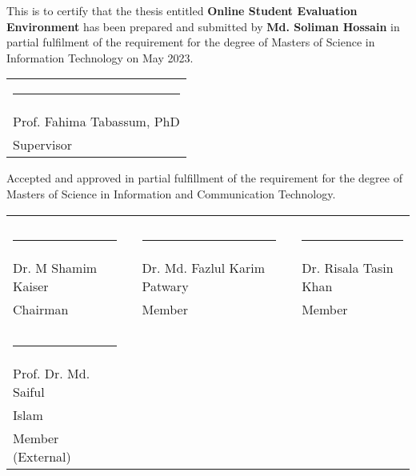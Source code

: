 This is to certify that the thesis entitled \textbf{Online Student Evaluation Environment} has been prepared and submitted by \textbf{Md. Soliman Hossain} in partial fulfilment of the requirement for the degree of
Masters of Science in Information Technology on May 2023.
\bigskip
\bigskip
\bigskip

\noindent \begin{tabular}{l}
\rule{6cm}{1pt} \\
Prof. Fahima Tabassum, PhD\\Supervisor
\end{tabular}


\vspace{.3in}
Accepted and approved in partial fulfillment of the requirement for the degree of Masters of Science in Information and Communication Technology.


\vspace{.3in}

\noindent \begin{tabular}{p{4.5cm}p{.5cm}p{4.5cm}p{.5cm}p{4.5cm}}
\centering
     && &&   \\
     && &&   \\
  \rule{4.5cm}{1pt} &  & \rule{4.5cm}{1pt} &  & \rule{4.5cm}{1pt}\\
  Dr. M Shamim Kaiser &&Dr. Md. Fazlul Karim Patwary &&Dr. Risala Tasin Khan\\
  Chairman &&Member &&Member\\
     
     && &&   \\
     && &&   \\
  \rule{4.5cm}{1pt}\\
  Prof. Dr. Md. Saiful \\Islam \\
  Member (External) 
\end{tabular}



